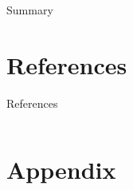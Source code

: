 \documentclass[aspectratio=43]{beamer}
\begin{document}
\begin{frame}{Summary}

\end{frame}


\section{References}
\begin{frame}{References}
   \begin{columns}
      \begin{column}{0.9\textwidth}

         \printbibliography[heading=none]
      \end{column}
   \end{columns}

\end{frame}


\section*{Appendix}
\end{document}
